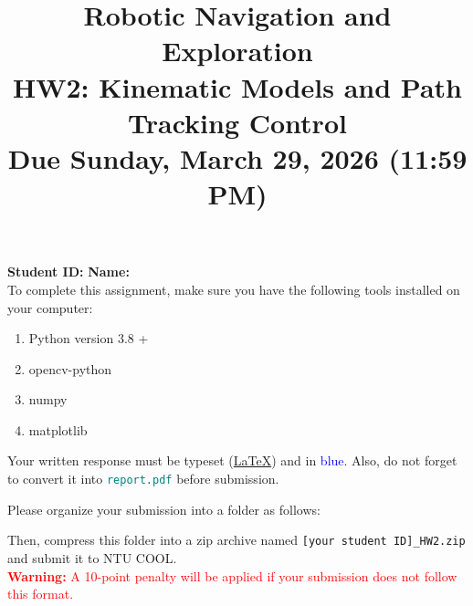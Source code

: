 \documentclass[11pt]{article}
\title{Robotic Navigation and Exploration\\HW2: Kinematic Models and Path Tracking Control\\Due Sunday, March 29, 2026 (11:59 PM)}
\author{}
\date{}
\begin{document}
\maketitle

\noindent\textbf{Student ID:} \underline{\makebox[5cm][l]{\textcolor{blue}{111030034}}}\hfill\textbf{Name:} \underline{\makebox[5cm][l]{\textcolor{blue}{陳安楷}}} \\


\noindent To complete this assignment, make sure you have the following tools installed on your computer:
\begin{enumerate}
    \item Python version 3.8 +
    \item opencv-python
    \item numpy
    \item matplotlib
\end{enumerate}

\noindent Your written response must be typeset (\href{https://www.overleaf.com/read/xjnwwpbhzvhk#c13aac}{\LaTeX}) and in \textcolor{blue}{blue}. Also, do not forget to convert it into \textcolor{teal}{\texttt{report.pdf}} before submission.

\vspace{0.5em}
\noindent Please organize your submission into a folder as follows:
\vspace{0.5em}

\noindent
{}
\vspace{0.5em}

\noindent Then, compress this folder into a zip archive named \texttt{[your student ID]\_HW2.zip} and submit it to NTU COOL. \\
\textcolor{red}{\textbf{Warning:} A 10-point penalty will be applied if your submission does not follow this format.}
\end{document}
